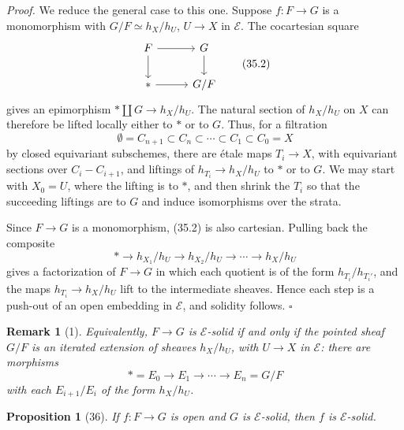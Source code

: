 \documentclass[11pt]{article}
\newcommand{\pt}{*}
\theoremstyle{deligne}
\newtheorem*{proposition*}{Proposition}
\newtheorem*{remark*}{Remark}
\newenvironment{proofdel}{\noindent\textit{Proof.}}{\hfill$\square$}
\begin{document}
\begin{proofdel}
We reduce the general case to this one. Suppose \(f:F\to G\) is a monomorphism with \(G/F\simeq h_X/h_U\), \(U\to X\) in \(\mathcal E\). The cocartesian square
\[
\begin{tikzcd}[column sep=2.8em,row sep=1.8em]
F \arrow[r] \arrow[d] & G \arrow[d]\\
\pt \arrow[r] & G/F
\end{tikzcd}
\tag{35.2}
\]
gives an epimorphism \(\pt\amalg G\to h_X/h_U\). The natural section of \(h_X/h_U\) on \(X\) can therefore be lifted locally either to \(\pt\) or to \(G\). Thus, for a filtration
\[
\emptyset=C_{n+1}\subset C_n\subset\cdots\subset C_1\subset C_0=X
\]
by closed equivariant subschemes, there are étale maps \(T_i\to X\), with equivariant sections over \(C_i-C_{i+1}\), and liftings of \(h_{T_i}\to h_X/h_U\) to \(\pt\) or to \(G\). We may start with \(X_0=U\), where the lifting is to \(\pt\), and then shrink the \(T_i\) so that the succeeding liftings are to \(G\) and induce isomorphisms over the strata.

Since \(F\to G\) is a monomorphism, (35.2) is also cartesian. Pulling back the composite
\[
\pt\longrightarrow h_{X_1}/h_U\longrightarrow h_{X_2}/h_U\longrightarrow\cdots\longrightarrow h_X/h_U
\]
gives a factorization of \(F\to G\) in which each quotient is of the form \(h_{T_i}/h_{T_i'}\), and the maps \(h_{T_i}\to h_X/h_U\) lift to the intermediate sheaves. Hence each step is a push-out of an open embedding in \(\mathcal E\), and solidity follows.
\end{proofdel}

\begin{remark*}[1]
Equivalently, \(F\to G\) is \(\mathcal E\)-solid if and only if the pointed sheaf \(G/F\) is an iterated extension of sheaves \(h_X/h_U\), with \(U\to X\) in \(\mathcal E\): there are morphisms
\[
\pt=E_0\to E_1\to\cdots\to E_n=G/F
\]
with each \(E_{i+1}/E_i\) of the form \(h_X/h_U\).
\end{remark*}

\begin{proposition*}[36]
If \(f:F\to G\) is open and \(G\) is \(\mathcal E\)-solid, then \(f\) is \(\mathcal E\)-solid.
\end{proposition*}
\end{document}
